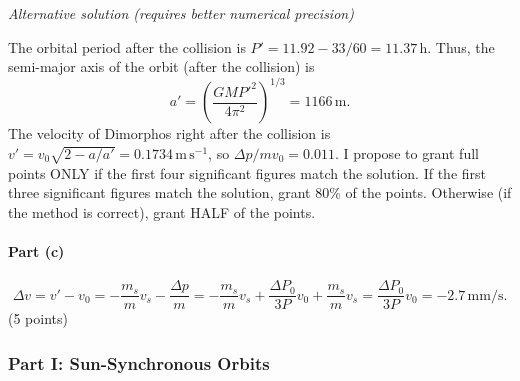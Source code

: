 \medskip
\textit{Alternative solution (requires better numerical precision)}

The orbital period after the collision is
$P' = 11.92 - 33/60 = 11.37$\,h. Thus, the semi-major axis of the orbit (after
the collision) is
\[
  a' = \left(\frac{GMP'^2}{4\pi^2}\right)^{1/3} = 1166\,\mathrm{m}.
\]
The velocity of Dimorphos right after the collision is
$v' = v_0\sqrt{2 - a/a'} = 0.1734\,\mathrm{m\,s^{-1}}$, so
$\Delta p/mv_0 = 0.011$. I propose to grant full points ONLY if the first four
significant figures match the solution. If the first three significant figures
match the solution, grant 80\% of the points. Otherwise (if the method is
correct), grant HALF of the points.

\paragraph{Part (c)}
\[
  \Delta v = v' - v_0
    = -\frac{m_s}{m}v_s - \frac{\Delta p}{m}
    = -\frac{m_s}{m}v_s + \frac{\Delta P_0}{3P}v_0 + \frac{m_s}{m}v_s
    = \frac{\Delta P_0}{3P}v_0 = -2.7\,\mathrm{mm/s}.
\]
\hfill(5 points)

\subsubsection*{Part I: Sun-Synchronous Orbits}

